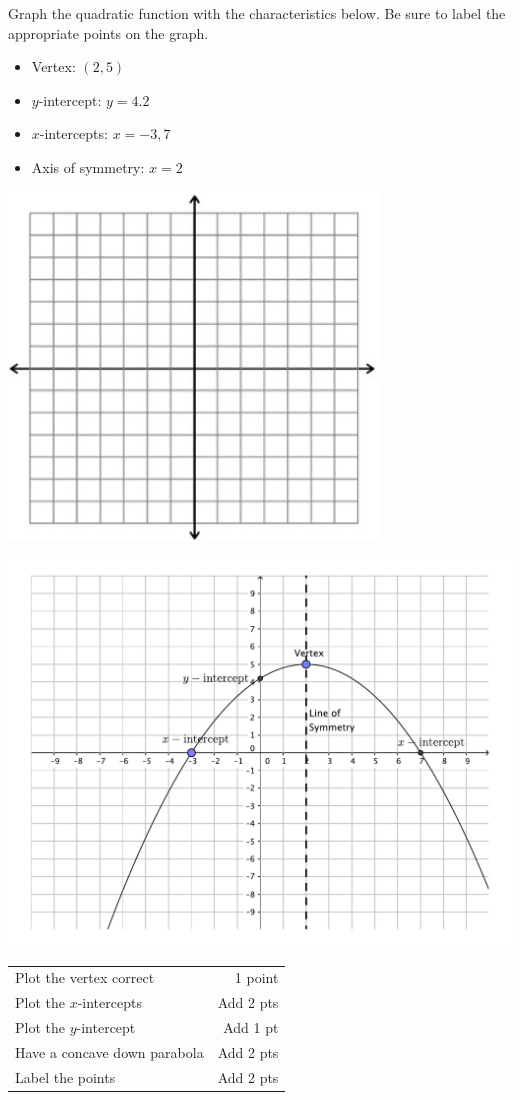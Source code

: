 {
	Graph the quadratic function with the characteristics below.  Be sure to label the appropriate points on the graph.
	\begin{itemize} 
	\item	Vertex: $(2,5)$  
	\item $y$-intercept: $y=4.2$ 
	\item $x$-intercepts: $x=-3,7$
	\item Axis of symmetry: $x=2$
	\end{itemize}
	\begin{onlyproblem}\begin{center}\includegraphics{fig-graphpaper.png}\end{center}\end{onlyproblem} \begin{onlysolution}\begin{center}\includegraphics{fig100-18_5-b-answer}\end{center}\end{onlysolution}}
{
	\begin{tabular}{l r}
	Plot the vertex correct&1 point\\
	Plot the $x$-intercepts& Add 2 pts\\
	Plot the $y$-intercept & Add 1 pt\\
	Have a concave down parabola&Add 2 pts\\
	Label the points&Add 2 pts
	\end{tabular}
}

